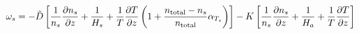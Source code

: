 \begin{equation}
\omega_s = -\tilde{D} 
                \left[
                      \frac{1}{n_s}\frac{\partial n_s}{\partial z} + \frac{1}{H_s} + 
                      \frac{1}{T}\frac{\partial T}{\partial z}\left(1 + \frac{n_\text{total} - n_s}{n_\text{total}}\alpha_{T_s}\right)
                \right] 
           - K 
                \left[
                     \frac{1}{n_s}\frac{\partial n_s}{\partial z} + \frac{1}{H_a} + \frac{1}{T}\frac{\partial T}{\partial z}
                \right]
\label{Titan:omega_diff}
\end{equation}
